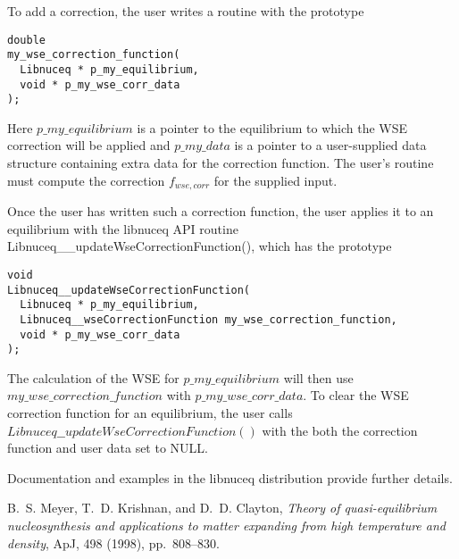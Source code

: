 \documentclass{article}    %
\newcommand{\apj}{ApJ}
\begin{document}
To add a correction, the user writes a routine with the prototype
\begin{verbatim}
double
my_wse_correction_function(
  Libnuceq * p_my_equilibrium,
  void * p_my_wse_corr_data
);
\end{verbatim}
Here $p\_my\_equilibrium$ is a pointer to the equilibrium to which the
WSE correction will be applied and $p\_my\_data$ is a pointer to a
user-supplied data structure containing extra data for the correction
function.  The user's routine must compute the correction $f_{wse,corr}$
for the supplied input.

Once the user has written such a correction function, the user applies
it to an equilibrium with the libnuceq API routine
Libnuceq\_\_updateWseCorrectionFunction(), which has the prototype
\begin{verbatim}
void
Libnuceq__updateWseCorrectionFunction(
  Libnuceq * p_my_equilibrium,
  Libnuceq__wseCorrectionFunction my_wse_correction_function,
  void * p_my_wse_corr_data
);
\end{verbatim}
The calculation of the WSE for $p\_my\_equilibrium$ will then use
$my\_wse\_correction\_function$ with $p\_my\_wse\_corr\_data$.  To
clear the WSE correction function for an equilibrium, the user calls
$Libnuceq\_\_updateWseCorrectionFunction()$ with the both
the correction function and user data set to NULL.

Documentation and examples in the libnuceq distribution provide further
details.

\begin{thebibliography}{1}

{\sc B.~S. {Meyer}, T.~D. {Krishnan}, and D.~D. {Clayton}}, {\em Theory of
  quasi-equilibrium nucleosynthesis and applications to matter expanding from
  high temperature and density}, \apj, 498 (1998), pp.~808--830.

\end{thebibliography}
\end{document}
